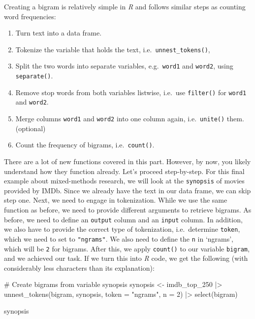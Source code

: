 \documentclass[
  letterpaper,
]{krantz}
\makeatletter
\newenvironment{Shaded}{\begin{snugshade}}{\end{snugshade}}
\newcommand{\AttributeTok}[1]{\textcolor[rgb]{0.40,0.45,0.13}{#1}}
\newcommand{\CommentTok}[1]{\textcolor[rgb]{0.37,0.37,0.37}{#1}}
\newcommand{\DecValTok}[1]{\textcolor[rgb]{0.68,0.00,0.00}{#1}}
\newcommand{\FunctionTok}[1]{\textcolor[rgb]{0.28,0.35,0.67}{#1}}
\newcommand{\NormalTok}[1]{\textcolor[rgb]{0.00,0.23,0.31}{#1}}
\newcommand{\OtherTok}[1]{\textcolor[rgb]{0.00,0.23,0.31}{#1}}
\newcommand{\SpecialCharTok}[1]{\textcolor[rgb]{0.37,0.37,0.37}{#1}}
\newcommand{\StringTok}[1]{\textcolor[rgb]{0.13,0.47,0.30}{#1}}
\providecommand{\tightlist}{%
  \setlength{\itemsep}{0pt}\setlength{\parskip}{0pt}}\usepackage{longtable,booktabs,array}
\newenvironment{kframe}{%
\medskip{}
\setlength{\fboxsep}{.8em}
 \def\at@end@of@kframe{}%
 \ifinner\ifhmode%
  \def\at@end@of@kframe{\end{minipage}}%
  \begin{minipage}{\columnwidth}%
 \fi\fi%
 \def\FrameCommand##1{\hskip\@totalleftmargin \hskip-\fboxsep
 \colorbox{shadecolor}{##1}\hskip-\fboxsep
     \hskip-\linewidth \hskip-\@totalleftmargin \hskip\columnwidth}%
 \MakeFramed {\advance\hsize-\width
   \@totalleftmargin\z@ \linewidth\hsize
   \@setminipage}}%
 {\par\unskip\endMakeFramed%
 \at@end@of@kframe}
\renewenvironment{Shaded}{\begin{kframe}}{\end{kframe}}
\makeatother
\begin{document}
Creating a bigram is relatively simple in \emph{R} and follows similar
steps as counting word frequencies:

\begin{enumerate}
\def\labelenumi{\arabic{enumi}.}
\tightlist
\item
  Turn text into a data frame.
\item
  Tokenize the variable that holds the text,
  i.e.~\texttt{unnest\_tokens()},
\item
  Split the two words into separate variables, e.g.~\texttt{word1} and
  \texttt{word2}, using \texttt{separate()}.
\item
  Remove stop words from both variables listwise, i.e.~use
  \texttt{filter()} for \texttt{word1} and \texttt{word2}.
\item
  Merge columns \texttt{word1} and \texttt{word2} into one column again,
  i.e.~\texttt{unite()} them. (optional)
\item
  Count the frequency of bigrams, i.e.~\texttt{count()}.
\end{enumerate}

There are a lot of new functions covered in this part. However, by now,
you likely understand how they function already. Let's proceed
step-by-step. For this final example about mixed-methods research, we
will look at the \texttt{synopsis} of movies provided by IMDb. Since we
already have the text in our data frame, we can skip step one. Next, we
need to engage in tokenization. While we use the same function as
before, we need to provide different arguments to retrieve bigrams. As
before, we need to define an \texttt{output} column and an
\texttt{input} column. In addition, we also have to provide the correct
type of tokenization, i.e.~determine \texttt{token}, which we need to
set to \texttt{"ngrams"}. We also need to define the \texttt{n} in
`ngrams', which will be \texttt{2} for bigrams. After this, we apply
\texttt{count()} to our variable \texttt{bigram}, and we achieved our
task. If we turn this into \emph{R} code, we get the following (with
considerably less characters than its explanation):

\begin{Shaded}
\begin{Highlighting}[]
\CommentTok{\# Create bigrams from variable synopsis}
\NormalTok{synopsis }\OtherTok{\textless{}{-}}
\NormalTok{  imdb\_top\_250 }\SpecialCharTok{|\textgreater{}}
  \FunctionTok{unnest\_tokens}\NormalTok{(bigram, synopsis, }\AttributeTok{token =} \StringTok{"ngrams"}\NormalTok{, }\AttributeTok{n =} \DecValTok{2}\NormalTok{) }\SpecialCharTok{|\textgreater{}}
  \FunctionTok{select}\NormalTok{(bigram)}

\NormalTok{synopsis}
\end{Highlighting}
\end{Shaded}
\end{document}
